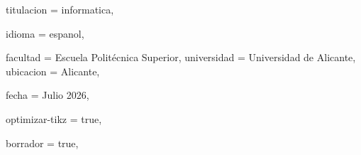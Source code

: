 {  %
  titulacion = informatica,
  
  idioma = espanol,
  
  
  facultad = {Escuela Politécnica Superior},
  universidad = {Universidad de Alicante},
  ubicacion = {Alicante},
  
  
  fecha = {Julio 2026},
  
  optimizar-tikz = true,
  
  borrador = true,
}


